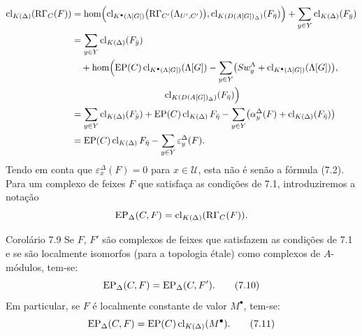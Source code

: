 \[
\begin{aligned}
\clK{\Delta}(\RG_C(F))
&=\operatorname{hom}\Bigl(
\clKstar{\Lambda[G]}\bigl(\RG_{C'}(\Lambda_{U',C'})\bigr),
\cl_{K(D(A[G])_\Delta)}(F_{\bar\eta})\Bigr)
 +\sum_{y\in Y}\clK{\Delta}(F_{\bar y})\\
&=\sum_{y\in Y}\clK{\Delta}(F_{\bar y})\\
&\quad +\operatorname{hom}\Bigl(
\EP(C)\clKstar{\Lambda[G]}(\Lambda[G])
 -\sum_{y\in Y}\bigl(Sw_y^{\Lambda}+\clKstar{\Lambda[G]}(\Lambda[G])\bigr),\\
&\hspace{10em}\cl_{K(D(A[G])_\Delta)}(F_{\bar\eta})\Bigr)\\
&=\sum_{y\in Y}\clK{\Delta}(F_{\bar y})
 +\EP(C)\clK{\Delta}F_{\bar\eta}
 -\sum_{y\in Y}\bigl(\alpha_y^\Delta(F)+\clK{\Delta}(F_{\bar\eta})\bigr)\\
&=\EP(C)\clK{\Delta}F_{\bar\eta}
 -\sum_{y\in Y}\varepsilon_y^\Delta(F).
\end{aligned}
\]
Tendo em conta que $\varepsilon_x^\Delta(F)=0$ para $x\in\mathcal U$, esta não é senão a fórmula (7.2). Para um complexo de feixes $F$ que satisfaça as condições de 7.1, introduziremos a notação
\[
\operatorname{EP}_\Delta(C,F)=\operatorname{cl}_{K(\Delta)}(\mathrm{R}\Gamma_C(F)).
\]

\begin{statement}{Corolário 7.9}
Se $F$, $F'$ são complexos de feixes que satisfazem as condições de 7.1 e se são localmente isomorfos (para a topologia étale) como complexos de $A$-módulos, tem-se:
\[
\operatorname{EP}_\Delta(C,F)=\operatorname{EP}_\Delta(C,F').
\tag{7.10}
\]
Em particular, se $F$ é localmente constante de valor $M^\bullet$, tem-se:
\[
\operatorname{EP}_\Delta(C,F)=\operatorname{EP}(C)\operatorname{cl}_{K(\Delta)}(M^\bullet).
\tag{7.11}
\]
\end{statement}
